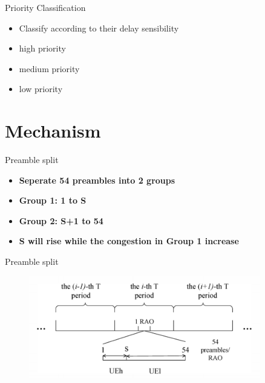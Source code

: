 \documentclass{beamer}
\begin{document}
\begin{frame}{Priority Classification}
    \begin{itemize}
        \item {Classify according to their delay sensibility}
        \item {high priority}
        \item {medium priority}
        \item {low priority}
    \end{itemize}
\end{frame}

\section{Mechanism}

\begin{frame} {Preamble split}
    \begin{itemize}
        \item \textbf{Seperate 54 preambles into 2 groups}
        \item \textbf{Group 1: 1 to S}
        \item \textbf{Group 2: S+1 to 54}
        \item \textbf{S will rise while the congestion in Group 1 increase} 
    \end{itemize}
\end{frame}
\begin{frame} {Preamble split}
    \begin{figure}[t]
    \centering
    \includegraphics[width=0.9\textwidth]{figures/p1.png}
\end{figure}
\end{frame}
\end{document}
